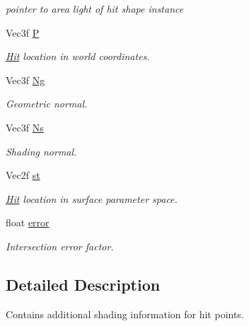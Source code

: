 \begin{DoxyCompactItemize}
\begin{DoxyCompactList}\small\item\em pointer to area light of hit shape instance \item\end{DoxyCompactList}\item 
Vec3f \hyperlink{structembree_1_1_differential_geometry_accb803ee82e59dce5a4aeb5e336101dc}{P}
\begin{DoxyCompactList}\small\item\em \hyperlink{structembree_1_1_hit}{Hit} location in world coordinates. \item\end{DoxyCompactList}\item 
Vec3f \hyperlink{structembree_1_1_differential_geometry_a80563fbecb4f02b557437933bca5798b}{Ng}
\begin{DoxyCompactList}\small\item\em Geometric normal. \item\end{DoxyCompactList}\item 
Vec3f \hyperlink{structembree_1_1_differential_geometry_a7c1fe2671801ed94e10d67b340bfd40c}{Ns}
\begin{DoxyCompactList}\small\item\em Shading normal. \item\end{DoxyCompactList}\item 
Vec2f \hyperlink{structembree_1_1_differential_geometry_ae1663be15511c0bb07a8558ba9b169ed}{st}
\begin{DoxyCompactList}\small\item\em \hyperlink{structembree_1_1_hit}{Hit} location in surface parameter space. \item\end{DoxyCompactList}\item 
float \hyperlink{structembree_1_1_differential_geometry_aa73cefe912dbe7c16052eb0a37ff4aa5}{error}
\begin{DoxyCompactList}\small\item\em Intersection error factor. \item\end{DoxyCompactList}\end{DoxyCompactItemize}


\subsection{Detailed Description}
Contains additional shading information for hit points. 

